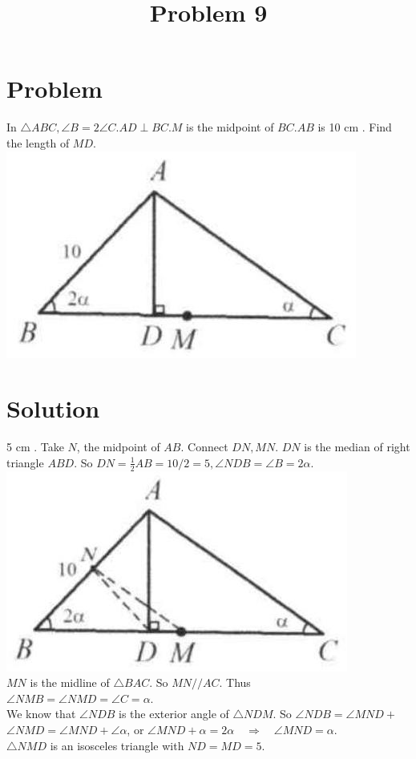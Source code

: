 \documentclass{article}
\title{Problem 9}
\date{}
\begin{document}
\maketitle

\section*{Problem}
In \(\triangle A B C, \angle B=2 \angle C . A D \perp B C . M\) is the midpoint of \(B C . A B\) is 10 cm . Find the length of \(M D\).\\
\centering
\includegraphics[width=\textwidth]{images/problem_image_1.jpg}

\section*{Solution}
5 cm .
Take \(N\), the midpoint of \(A B\). Connect \(D N, M N\). \(D N\) is the median of right triangle \(A B D\). So \(D N=\frac{1}{2} A B=10 / 2=5, \angle N D B=\angle B=2 \alpha\).\\
\centering
\includegraphics[width=\textwidth]{images/reasoning_image_1.jpg}\\
\(M N\) is the midline of \(\triangle B A C\). So \(M N / / A C\). Thus\\
\(\angle N M B=\angle N M D=\angle C=\alpha\).\\
We know that \(\angle N D B\) is the exterior angle of \(\triangle N D M\). So \(\angle N D B=\angle M N D+\) \(\angle N M D=\angle M N D+\angle \alpha\), or \(\angle M N D+\alpha=2 \alpha \quad \Rightarrow \quad \angle M N D=\alpha\).\\
\(\triangle N M D\) is an isosceles triangle with \(N D=M D=5\).
\end{document}
